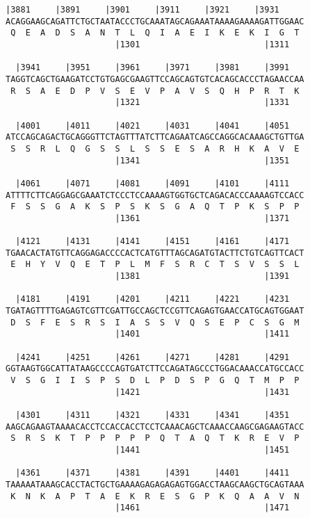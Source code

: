 \documentclass{article}
\begin{document}
\newpage
\begin{Verbatim}[fontfamily=courier]
  |3881     |3891     |3901     |3911     |3921     |3931   
ACAGGAAGCAGATTCTGCTAATACCCTGCAAATAGCAGAAATAAAAGAAAAGATTGGAAC
 Q  E  A  D  S  A  N  T  L  Q  I  A  E  I  K  E  K  I  G  T 
                      |1301                         |1311   

  |3941     |3951     |3961     |3971     |3981     |3991   
TAGGTCAGCTGAAGATCCTGTGAGCGAAGTTCCAGCAGTGTCACAGCACCCTAGAACCAA
 R  S  A  E  D  P  V  S  E  V  P  A  V  S  Q  H  P  R  T  K 
                      |1321                         |1331   

  |4001     |4011     |4021     |4031     |4041     |4051   
ATCCAGCAGACTGCAGGGTTCTAGTTTATCTTCAGAATCAGCCAGGCACAAAGCTGTTGA
 S  S  R  L  Q  G  S  S  L  S  S  E  S  A  R  H  K  A  V  E 
                      |1341                         |1351   

  |4061     |4071     |4081     |4091     |4101     |4111   
ATTTTCTTCAGGAGCGAAATCTCCCTCCAAAAGTGGTGCTCAGACACCCAAAAGTCCACC
 F  S  S  G  A  K  S  P  S  K  S  G  A  Q  T  P  K  S  P  P 
                      |1361                         |1371   

  |4121     |4131     |4141     |4151     |4161     |4171   
TGAACACTATGTTCAGGAGACCCCACTCATGTTTAGCAGATGTACTTCTGTCAGTTCACT
 E  H  Y  V  Q  E  T  P  L  M  F  S  R  C  T  S  V  S  S  L 
                      |1381                         |1391   

  |4181     |4191     |4201     |4211     |4221     |4231   
TGATAGTTTTGAGAGTCGTTCGATTGCCAGCTCCGTTCAGAGTGAACCATGCAGTGGAAT
 D  S  F  E  S  R  S  I  A  S  S  V  Q  S  E  P  C  S  G  M 
                      |1401                         |1411   

  |4241     |4251     |4261     |4271     |4281     |4291   
GGTAAGTGGCATTATAAGCCCCAGTGATCTTCCAGATAGCCCTGGACAAACCATGCCACC
 V  S  G  I  I  S  P  S  D  L  P  D  S  P  G  Q  T  M  P  P 
                      |1421                         |1431   

  |4301     |4311     |4321     |4331     |4341     |4351   
AAGCAGAAGTAAAACACCTCCACCACCTCCTCAAACAGCTCAAACCAAGCGAGAAGTACC
 S  R  S  K  T  P  P  P  P  P  Q  T  A  Q  T  K  R  E  V  P 
                      |1441                         |1451   

  |4361     |4371     |4381     |4391     |4401     |4411   
TAAAAATAAAGCACCTACTGCTGAAAAGAGAGAGAGTGGACCTAAGCAAGCTGCAGTAAA
 K  N  K  A  P  T  A  E  K  R  E  S  G  P  K  Q  A  A  V  N 
                      |1461                         |1471   

\end{Verbatim}
\end{document}
